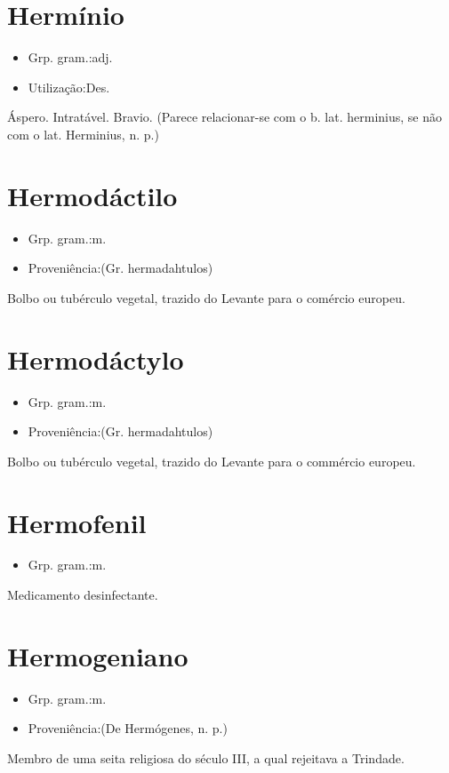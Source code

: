 \documentclass{article}
\begin{document}
\section{Hermínio}
\begin{itemize}
\item {Grp. gram.:adj.}
\end{itemize}
\begin{itemize}
\item {Utilização:Des.}
\end{itemize}
Áspero.
Intratável.
Bravio.
(Parece relacionar-se com o b. lat. \textunderscore herminius\textunderscore , se não com o lat. \textunderscore Herminius\textunderscore , n. p.)
\section{Hermodáctilo}
\begin{itemize}
\item {Grp. gram.:m.}
\end{itemize}
\begin{itemize}
\item {Proveniência:(Gr. \textunderscore hermadahtulos\textunderscore )}
\end{itemize}
Bolbo ou tubérculo vegetal, trazido do Levante para o comércio europeu.
\section{Hermodáctylo}
\begin{itemize}
\item {Grp. gram.:m.}
\end{itemize}
\begin{itemize}
\item {Proveniência:(Gr. \textunderscore hermadahtulos\textunderscore )}
\end{itemize}
Bolbo ou tubérculo vegetal, trazido do Levante para o commércio europeu.
\section{Hermofenil}
\begin{itemize}
\item {Grp. gram.:m.}
\end{itemize}
Medicamento desinfectante.
\section{Hermogeniano}
\begin{itemize}
\item {Grp. gram.:m.}
\end{itemize}
\begin{itemize}
\item {Proveniência:(De \textunderscore Hermógenes\textunderscore , n. p.)}
\end{itemize}
Membro de uma seita religiosa do século III, a qual rejeitava a Trindade.
\end{document}
